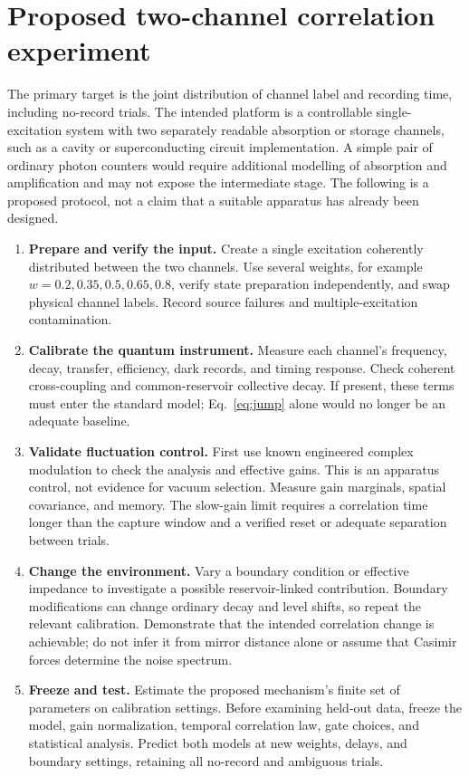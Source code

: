 \documentclass[11pt]{article}
\begin{document}
\section{Proposed two-channel correlation experiment}
The primary target is the joint distribution of channel label and recording time, including no-record trials. The intended platform is a controllable single-excitation system with two separately readable absorption or storage channels, such as a cavity or superconducting circuit implementation. A simple pair of ordinary photon counters would require additional modelling of absorption and amplification and may not expose the intermediate stage. The following is a proposed protocol, not a claim that a suitable apparatus has already been designed.

\begin{enumerate}
\item \textbf{Prepare and verify the input.} Create a single excitation coherently distributed between the two channels. Use several weights, for example $w=0.2,0.35,0.5,0.65,0.8$, verify state preparation independently, and swap physical channel labels. Record source failures and multiple-excitation contamination.
\item \textbf{Calibrate the quantum instrument.} Measure each channel's frequency, decay, transfer, efficiency, dark records, and timing response. Check coherent cross-coupling and common-reservoir collective decay. If present, these terms must enter the standard model; Eq.~\eqref{eq:jump} alone would no longer be an adequate baseline.
\item \textbf{Validate fluctuation control.} First use known engineered complex modulation to check the analysis and effective gains. This is an apparatus control, not evidence for vacuum selection. Measure gain marginals, spatial covariance, and memory. The slow-gain limit requires a correlation time longer than the capture window and a verified reset or adequate separation between trials.
\item \textbf{Change the environment.} Vary a boundary condition or effective impedance to investigate a possible reservoir-linked contribution. Boundary modifications can change ordinary decay and level shifts, so repeat the relevant calibration. Demonstrate that the intended correlation change is achievable; do not infer it from mirror distance alone or assume that Casimir forces determine the noise spectrum.
\item \textbf{Freeze and test.} Estimate the proposed mechanism's finite set of parameters on calibration settings. Before examining held-out data, freeze the model, gain normalization, temporal correlation law, gate choices, and statistical analysis. Predict both models at new weights, delays, and boundary settings, retaining all no-record and ambiguous trials.
\end{enumerate}
\end{document}
